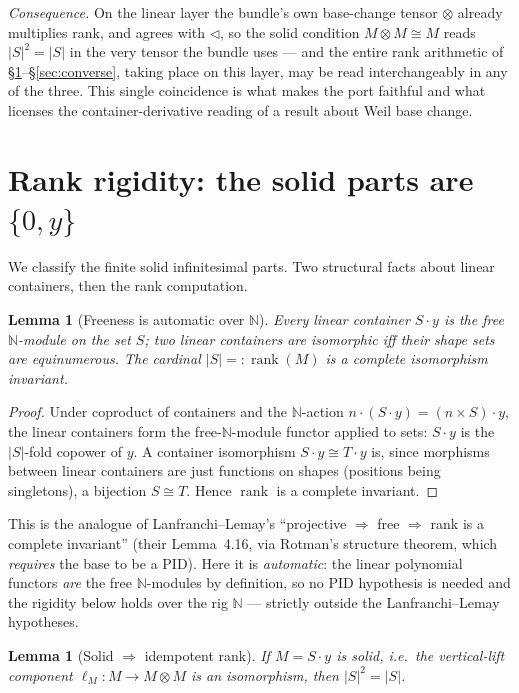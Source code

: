 \documentclass[11pt]{article}
\newtheorem{lemma}[theorem]{Lemma}
\theoremstyle{definition}
\newcommand{\N}{\mathbb{N}}
\newcommand{\rank}{\operatorname{rank}}
\begin{document}
\emph{Consequence.} On the linear layer the bundle's own base-change tensor $\otimes$ already
multiplies rank, and agrees with $\lhd$, so the solid condition $M\otimes M\cong M$ reads $|S|^2=|S|$
in the very tensor the bundle uses --- and the entire rank arithmetic of
\S\ref{sec:rigidity}--\S\ref{sec:converse}, taking place on this layer, may be read interchangeably
in any of the three. This single coincidence is what makes the port faithful and what licenses the
container-derivative reading of a result about Weil base change.

\section{Rank rigidity: the solid parts are $\{0,y\}$}\label{sec:rigidity}

We classify the finite solid infinitesimal parts. Two structural facts about linear containers,
then the rank computation.

\begin{lemma}[Freeness is automatic over $\N$]\label{lem:free}
Every linear container $S\cdot y$ is the free $\N$-module on the set $S$; two linear containers are
isomorphic iff their shape sets are equinumerous. The cardinal $|S|=:\rank(M)$ is a complete
isomorphism invariant.
\end{lemma}

\begin{proof}
Under coproduct of containers and the $\N$-action $n\cdot(S\cdot y)=(n\times S)\cdot y$, the linear
containers form the free-$\N$-module functor applied to sets: $S\cdot y$ is the $|S|$-fold copower of
$y$. A container isomorphism $S\cdot y\cong T\cdot y$ is, since morphisms between linear containers
are just functions on shapes (positions being singletons), a bijection $S\cong T$. Hence $\rank$ is
a complete invariant.
\end{proof}

This is the analogue of Lanfranchi--Lemay's ``projective $\Rightarrow$ free $\Rightarrow$ rank is a
complete invariant'' (their Lemma~4.16, via Rotman's structure theorem, which \emph{requires} the
base to be a PID). Here it is \emph{automatic}: the linear polynomial functors \emph{are} the free
$\N$-modules by definition, so no PID hypothesis is needed and the rigidity below holds over the
rig $\N$ --- strictly outside the Lanfranchi--Lemay hypotheses.

\begin{lemma}[Solid $\Rightarrow$ idempotent rank]\label{lem:solid}
If $M=S\cdot y$ is solid, i.e.\ the vertical-lift component $\ell_M\colon M\to M\otimes M$ is an
isomorphism, then $|S|^2=|S|$.
\end{lemma}
\end{document}
